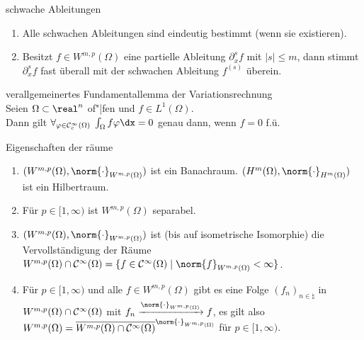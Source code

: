 \linie
\pagebreak

\begin{Satz}{schwache Ableitungen}
    \begin{enumerate}
        \item
        Alle schwachen Ableitungen sind eindeutig bestimmt (wenn sie existieren).
        
        \item
        Besitzt $f \in W^{m,p}(\Omega)$ eine partielle Ableitung $\partial_x^s f$ mit $|s| \le m$,
        dann stimmt $\partial_x^s f$ fast überall mit der schwachen Ableitung $f^{(s)}$ überein.
    \end{enumerate}
\end{Satz}

\begin{Lemma}{verallgemeinertes Fundamentallemma der Variationsrechnung}\\
    Seien $\Omega \subset \real^n$ of"|fen und $f \in L^1(\Omega)$.\\
    Dann gilt $\forall_{\varphi \in \C^\infty_c(\Omega)}\; \int_\Omega f\varphi \dx = 0$
    genau dann, wenn $f = 0$ f.ü.
\end{Lemma}

\begin{Satz}{Eigenschaften der räume}
    \begin{enumerate}
        \item
        $(W^{m,p}(\Omega), \norm{\cdot}_{W^{m,p}(\Omega)})$ ist ein Banachraum.
        $(H^m(\Omega), \norm{\cdot}_{H^m(\Omega)})$ ist ein Hilbertraum.
        
        \item
        Für $p \in [1, \infty)$ ist $W^{m,p}(\Omega)$ separabel.
        
        \item
        $(W^{m,p}(\Omega), \norm{\cdot}_{W^{m,p}(\Omega)})$ ist
        (bis auf isometrische Isomorphie) die Vervollständigung der Räume
        $W^{m,p}(\Omega) \cap \C^\infty(\Omega) =
        \{f \in \C^\infty(\Omega) \;|\; \norm{f}_{W^{m,p}(\Omega)} < \infty\}$.
        
        \item
        Für $p \in [1, \infty)$ und alle $f \in W^{m,p}(\Omega)$ gibt es eine Folge
        $(f_n)_{n \in \natural}$ in $W^{m,p}(\Omega) \cap \mathcal{C}^\infty(\Omega)$ mit
        $f_n \xrightarrow{\norm{\cdot}_{W^{m,p}(\Omega)}} f$,
        es gilt also $W^{m,p}(\Omega) =
        \overline{W^{m,p}(\Omega) \cap \C^\infty(\Omega)}^{\norm{\cdot}_{W^{m,p}(\Omega)}}$
        für $p \in [1, \infty)$.
    \end{enumerate}
\end{Satz}

